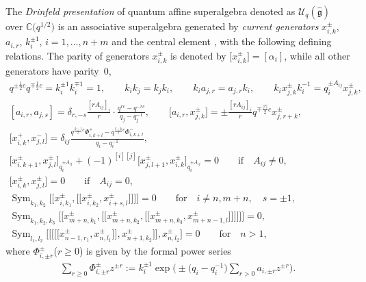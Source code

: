 \documentclass[10pt,a4paper]{amsart}
\numberwithin{equation}{section}
\begin{document}
\begin{Definition}
The \emph{Drinfeld presentation} of quantum affine superalgebra denoted as $\mathcal{U}_q(\mathfrak{\hat{g}})$ over $\mathbb{C}\bigl(q^{1/2}\bigr)$ is an associative superalgebra generated by \emph{current generators} $x_{i,k}^{\pm}$, $a_{i,r}$, $k_i^{\pm 1}$, $i=1,\dots,n+m$ and the central element , with the following defining relations. The parity of generators $x_{i,k}^{\pm}$ is denoted by $\bigl[x_{i,k}^{\pm}\bigr]=[\alpha_i]$, while all other generators have parity~0,
\begin{gather*}%
 q^{\pm\frac{1}{2}c}q^{\mp\frac{1}{2}c}=k_i^{\pm 1}k_i^{\mp 1}=1, \qquad k_ik_j=k_jk_i, \qquad
 k_ia_{j,r}=a_{j,r}k_i, \qquad k_ix_{j,k}^{\pm}k_i^{-1}=q_i^{\pm A_{ij}}x_{j,k}^{\pm}, \\
 [a_{i,r}, a_{j,s}]=\delta_{r,-s}\frac{[r A_{ij}]_{i}}{r}\cdot\frac{q^{r c}-q^{-r c}}{q_j-q_j^{-1}}, \qquad
 \bigl[a_{i,r}, x_{j,k}^{\pm}\bigr]=\pm\frac{[r A_{ij}]_{i}}{r}q^{\mp\frac{|r|}{2}c}x_{j,r+k}^{\pm}, \\
 \bigl[x_{i,k}^+, x_{j,l}^-\bigr]=\delta_{ij}\frac{q^{\frac{k-l}{2}c}\Phi_{i,k+l}^+-q^{\frac{l-k}{2}c}\Phi_{i,k+l}^-}{q_i-q_i^{-1}}, \\
 \bigl[x_{i,k+1}^{\pm}, x_{j,l}^{\pm}\bigr]_{q_i^{\pm A_{ij}}}+(-1)^{[i][j]}\bigl[x_{j,l+1}^{\pm}, x_{i,k}^{\pm}\bigr]_{q_i^{\pm A_{ij}}}=0 \qquad\textrm{if}\quad A_{ij}\neq0, \\
 \bigl[x_{i,k}^{\pm}, x_{j,l}^{\pm}\bigr]=0\qquad \textrm{if}\quad A_{ij}=0, \\
 \operatorname{Sym}_{k_1,k_2}\bigl[\!\!\bigl[x_{i,k_1}^{\pm},\bigl[\!\!\bigl[x_{i,k_2}^{\pm}, x_{i+s,l}^{\pm}\bigr]\!\!\bigr] \bigr]\!\!\bigr]=0\qquad\textrm{for}\quad i\neq n,m+n,\quad s=\pm 1, \\
 \operatorname{Sym}_{k_1,k_2,k_3}\bigl[\!\!\bigl[x_{m+n,k_1}^{\pm}, \bigl[\!\!\bigl[x_{m+n,k_2}^{\pm},\bigl[\!\!\bigl[x_{m+n,k_3}^{\pm}, x_{m+n-1,l}^{\pm}\bigr]\!\!\bigr] \bigr]\!\!\bigr] \bigr]\!\!\bigr]=0, \\
 \operatorname{Sym}_{l_1,l_2}\bigl[ \bigl[\!\!\bigl[ \bigl[\!\!\bigl[x_{n-1,r_1}^{\pm}, x_{n,l_1}^{\pm}\bigr]\!\!\bigr], x_{n+1,k_2}^{\pm}\bigr]\!\!\bigr], x_{n,l_2}^{\pm}\bigr]=0
\qquad\textrm{for}\quad n>1,
\end{gather*}
where $\Phi_{i,\pm r}^{\pm}$($r\geqslant 0$) is given by the formal power series
\begin{gather*}%
 \sum\limits_{r\geqslant 0}\Phi_{i,\pm r}^{\pm}z^{\pm r}:=k_i^{\pm 1}\exp\biggl(\pm \bigl(q_i-q_i^{-1}\bigr)\sum\limits_{r>0}a_{i,\pm r}z^{\pm r}\biggr).
\end{gather*}
\end{Definition}
\end{document}

